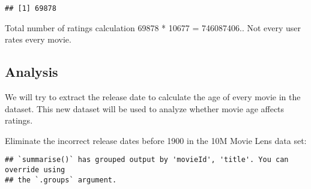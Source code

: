 \documentclass[
]{article}
\newenvironment{Shaded}{\begin{snugshade}}{\end{snugshade}}
\newcommand{\AttributeTok}[1]{\textcolor[rgb]{0.77,0.63,0.00}{#1}}
\newcommand{\CommentTok}[1]{\textcolor[rgb]{0.56,0.35,0.01}{\textit{#1}}}
\newcommand{\ConstantTok}[1]{\textcolor[rgb]{0.00,0.00,0.00}{#1}}
\newcommand{\FunctionTok}[1]{\textcolor[rgb]{0.00,0.00,0.00}{#1}}
\newcommand{\NormalTok}[1]{#1}
\newcommand{\OtherTok}[1]{\textcolor[rgb]{0.56,0.35,0.01}{#1}}
\newcommand{\SpecialCharTok}[1]{\textcolor[rgb]{0.00,0.00,0.00}{#1}}
\newcommand{\StringTok}[1]{\textcolor[rgb]{0.31,0.60,0.02}{#1}}
\begin{document}
\begin{verbatim}
## [1] 69878
\end{verbatim}

Total number of ratings calculation 69878 * 10677 = 746087406.. Not
every user rates every movie.

\hypertarget{analysis}{%
\subsection{Analysis}\label{analysis}}

We will try to extract the release date to calculate the age of every
movie in the dataset. This new dataset will be used to analyze whether
movie age affects ratings.

\begin{Shaded}
\end{Shaded}

Eliminate the incorrect release dates before 1900 in the 10M Movie Lens
data set:

\begin{verbatim}
## `summarise()` has grouped output by 'movieId', 'title'. You can override using
## the `.groups` argument.
\end{verbatim}
\end{document}
